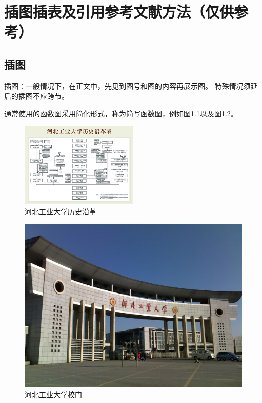 \chapter{插图插表及引用参考文献方法（仅供参考）}

\section{插图}
插图：一般情况下，在正文中，先见到图号和图的内容再展示图。
特殊情况须延后的插图不应跨节。

通常使用的函数图采用简化形式，称为简写函数图，例如图{\ref{fig:historyhebut}}以及图{\ref{fig:河北工业大学校门}}。
\begin{figure}[ht]
    \centering                                                      %
    \includegraphics[width=0.5\textwidth]{figures/historyhebut}     %
    \caption{河北工业大学历史沿革}\label{fig:historyhebut}            %
\end{figure}

\begin{figure}[ht]
    \centering
    \includegraphics[width=\textwidth]{figures/河北工业大学校门}
    \caption{河北工业大学校门}\label{fig:河北工业大学校门}
\end{figure}

